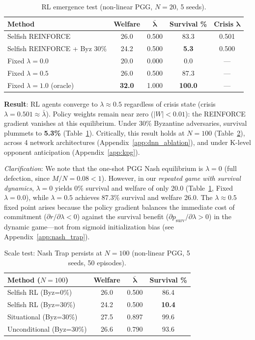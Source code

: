 \documentclass{article}
\begin{document}
\begin{table}[t]
\centering
\caption{RL emergence test (non-linear PGG, $N{=}20$, 5 seeds).}
\label{tab:emergence}
\begin{tabular}{lcccc}
\toprule
\textbf{Method} & \textbf{Welfare} & $\boldsymbol{\bar{\lambda}}$ & \textbf{Survival \%} & \textbf{Crisis $\boldsymbol{\lambda}$} \\
\midrule
Selfish REINFORCE & 26.0 & 0.500 & 83.3 & 0.501 \\
Selfish REINFORCE + Byz 30\% & 24.2 & 0.500 & \textbf{5.3} & 0.500 \\
\midrule
Fixed $\lambda=0.0$ & 20.0 & 0.000 & 0.0 & --- \\
Fixed $\lambda=0.5$ & 26.0 & 0.500 & 87.3 & --- \\
Fixed $\lambda=1.0$ (oracle) & \textbf{32.0} & 1.000 & \textbf{100.0} & --- \\
\bottomrule
\end{tabular}
\end{table}

\textbf{Result}: RL agents converge to $\lambda \approx 0.5$ regardless of crisis state (crisis $\lambda = 0.501 \approx \bar{\lambda}$).
Policy weights remain near zero ($|W| < 0.01$): the REINFORCE gradient vanishes at this equilibrium.
Under 30\% Byzantine adversaries, survival plummets to \textbf{5.3\%} (Table~\ref{tab:emergence}).
Critically, this result holds at $N=100$ (Table~\ref{tab:scale}), across 4 network architectures (Appendix~\ref{app:dnn_ablation}), and under K-level opponent anticipation (Appendix~\ref{app:kpg}).

\noindent\textit{Clarification}: We note that the one-shot PGG Nash equilibrium is $\lambda=0$ (full defection, since $M/N = 0.08 < 1$).
However, in our \emph{repeated game with survival dynamics}, $\lambda=0$ yields 0\% survival and welfare of only 20.0 (Table~\ref{tab:emergence}, Fixed $\lambda=0.0$), while $\lambda=0.5$ achieves 87.3\% survival and welfare 26.0.
The $\lambda \approx 0.5$ fixed point arises because the policy gradient balances the immediate cost of commitment ($\partial r/\partial \lambda < 0$) against the survival benefit ($\partial p_{\text{surv}}/\partial \lambda > 0$) in the dynamic game---not from sigmoid initialization bias (see Appendix~\ref{app:nash_trap}).

\begin{table}[t]
\centering
\caption{Scale test: Nash Trap persists at $N{=}100$ (non-linear PGG, 5 seeds, 50 episodes).}
\label{tab:scale}
\begin{tabular}{lccc}
\toprule
\textbf{Method ($N{=}100$)} & \textbf{Welfare} & $\boldsymbol{\bar{\lambda}}$ & \textbf{Survival \%} \\
\midrule
Selfish RL (Byz=0\%) & 26.0 & 0.500 & 86.4 \\
Selfish RL (Byz=30\%) & 24.2 & 0.500 & \textbf{10.4} \\
\midrule
Situational (Byz=30\%) & 27.5 & 0.897 & 99.6 \\
Unconditional (Byz=30\%) & 26.6 & 0.790 & 93.6 \\
\bottomrule
\end{tabular}
\end{table}
\end{document}
